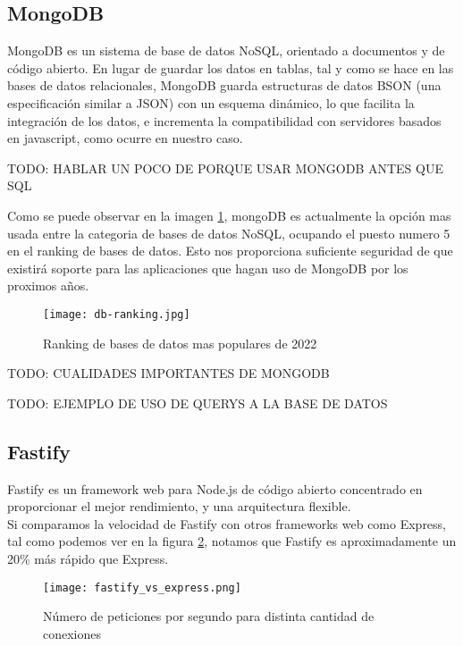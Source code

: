 \subsection{MongoDB}

MongoDB es un sistema de base de datos NoSQL, orientado a documentos y de código abierto. En lugar de guardar los datos en tablas, tal y como se hace en las bases de datos relacionales, MongoDB guarda estructuras de datos BSON (una especificación similar a JSON) con un esquema dinámico, lo que facilita la integración de los datos, e incrementa la compatibilidad con servidores basados en javascript, como ocurre en nuestro caso.

TODO: HABLAR UN POCO DE PORQUE USAR MONGODB ANTES QUE SQL

Como se puede observar en la imagen \ref{fig:db-ranking}, mongoDB es actualmente la opción mas usada entre la categoria de bases de datos NoSQL, ocupando el puesto numero 5 en el ranking de bases de datos. Esto nos proporciona suficiente seguridad de que existirá soporte para las aplicaciones que hagan uso de MongoDB por los proximos años.

\begin{figure}[H]
    \texttt{[image: db-ranking.jpg]}
    \caption{Ranking de bases de datos mas populares de 2022}
    \label{fig:db-ranking}
\end{figure}

TODO: CUALIDADES IMPORTANTES DE MONGODB

TODO: EJEMPLO DE USO DE QUERYS A LA BASE DE DATOS


\subsection{Fastify}

Fastify es un framework web para Node.js de código abierto concentrado en proporcionar el mejor rendimiento, y una arquitectura flexible. \\

Si comparamos la velocidad de Fastify con otros frameworks web como Express, tal como podemos ver en la figura \ref{fig:fastify_vs_express}, notamos que Fastify es aproximadamente un 20\% más rápido que Express. \\

\begin{figure}[H]
    \texttt{[image: fastify\_vs\_express.png]}
    \caption{ Número de peticiones por segundo para distinta cantidad de conexiones}
    \label{fig:fastify_vs_express}
\end{figure}


